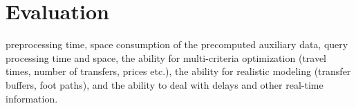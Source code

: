 \chapter*{Evaluation}

preprocessing time, space consumption of the precomputed auxiliary data, query processing time and space, the ability for multi-criteria optimization (travel times, number of transfers, prices etc.), the ability for realistic modeling (transfer buffers, foot paths), and the ability to deal with delays and other real-time information.